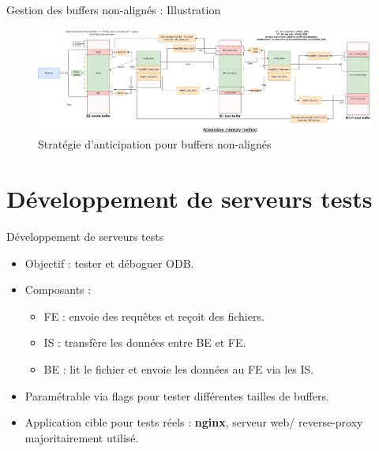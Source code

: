 \documentclass[aspectratio=43,8pt]{beamer}
\begin{document}
\begin{frame}{Gestion des buffers non-alignés : Illustration}
    \begin{figure}
        \includegraphics[width=\paperwidth]{img2/odb_adaptative_memory.png}
        \caption{Stratégie d'anticipation pour buffers non-alignés}
    \end{figure}
\end{frame}

\section{Développement de serveurs tests}
\begin{frame}{Développement de serveurs tests}
\begin{card}
    \begin{itemize}
        \item Objectif : tester et déboguer ODB.
        \item Composants :
        \begin{itemize}
            \item FE : envoie des requêtes et reçoit des fichiers.
            \item IS : transfère les données entre BE et FE.
            \item BE : lit le fichier et envoie les données au FE via les IS.
        \end{itemize}
        \item Paramétrable via flags pour tester différentes tailles de buffers.
        \item Application cible pour tests réels : \textbf{nginx}, serveur web/ reverse-proxy majoritairement utilisé.
    \end{itemize}
\end{card}
\end{frame}
\end{document}
